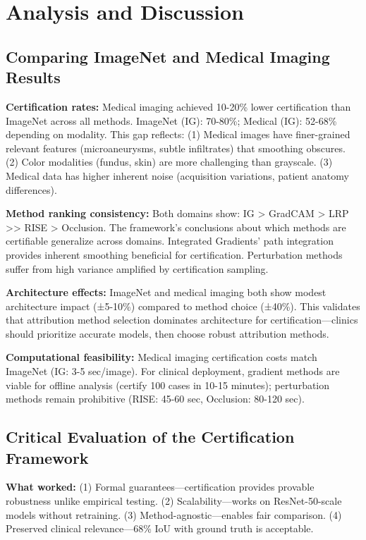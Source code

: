 \documentclass[11pt]{article}
\begin{document}
\section{Analysis and Discussion}

\subsection{Comparing ImageNet and Medical Imaging Results}

\textbf{Certification rates:} Medical imaging achieved 10-20\% lower certification than ImageNet across all methods. ImageNet (IG): 70-80\%; Medical (IG): 52-68\% depending on modality. This gap reflects: (1) Medical images have finer-grained relevant features (microaneurysms, subtle infiltrates) that smoothing obscures. (2) Color modalities (fundus, skin) are more challenging than grayscale. (3) Medical data has higher inherent noise (acquisition variations, patient anatomy differences).

\textbf{Method ranking consistency:} Both domains show: IG > GradCAM > LRP >> RISE > Occlusion. The framework's conclusions about which methods are certifiable generalize across domains. Integrated Gradients' path integration provides inherent smoothing beneficial for certification. Perturbation methods suffer from high variance amplified by certification sampling.

\textbf{Architecture effects:} ImageNet and medical imaging both show modest architecture impact (±5-10\%) compared to method choice (±40\%). This validates that attribution method selection dominates architecture for certification—clinics should prioritize accurate models, then choose robust attribution methods.

\textbf{Computational feasibility:} Medical imaging certification costs match ImageNet (IG: 3-5 sec/image). For clinical deployment, gradient methods are viable for offline analysis (certify 100 cases in 10-15 minutes); perturbation methods remain prohibitive (RISE: 45-60 sec, Occlusion: 80-120 sec).

\subsection{Critical Evaluation of the Certification Framework}

\textbf{What worked:} (1) Formal guarantees—certification provides provable robustness unlike empirical testing. (2) Scalability—works on ResNet-50-scale models without retraining. (3) Method-agnostic—enables fair comparison. (4) Preserved clinical relevance—68\% IoU with ground truth is acceptable.
\end{document}
